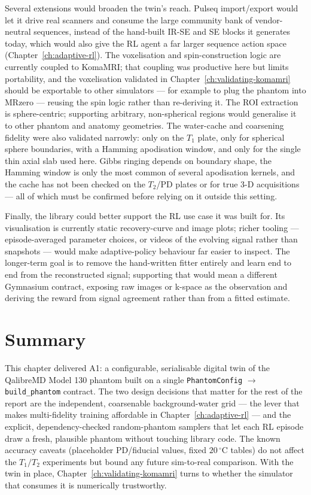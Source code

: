 Several extensions would broaden the twin's reach. Pulseq import/export would
let it drive real scanners and consume the large community bank of
vendor-neutral sequences, instead of the hand-built IR-SE and SE blocks it
generates today, which would also give the RL agent a far larger sequence
action space (Chapter~\ref{ch:adaptive-rl}). The voxelisation and
spin-construction logic are currently coupled to KomaMRI; that coupling was
productive here but limits portability, and the voxelisation validated in
Chapter~\ref{ch:validating-komamri} should be exportable to other simulators ---
for example to plug the phantom into MRzero --- reusing the spin logic rather
than re-deriving it. The ROI extraction is sphere-centric; supporting arbitrary,
non-spherical regions would generalise it to other phantom and anatomy
geometries. The water-cache and coarsening fidelity were also validated
narrowly: only on the $T_1$ plate, only for spherical sphere boundaries, with a
Hamming apodisation window, and only for the single thin axial slab used here.
Gibbs ringing depends on boundary shape, the Hamming window is only the most
common of several apodisation kernels, and the cache has not been checked on the
$T_2$/PD plates or for true 3-D acquisitions --- all of which must be confirmed
before relying on it outside this setting.

Finally, the library could better support the RL use case it was built for. Its
visualisation is currently static recovery-curve and image plots; richer tooling
--- episode-averaged parameter choices, or videos of the evolving signal rather
than snapshots --- would make adaptive-policy behaviour far easier to inspect.
The longer-term goal is to remove the hand-written fitter entirely and learn end
to end from the reconstructed signal; supporting that would mean a different
Gymnasium contract, exposing raw images or k-space as the observation and
deriving the reward from signal agreement rather than from a fitted estimate.

\section{Summary}
\label{sec:twin-summary}

This chapter delivered A1: a configurable, serialisable digital twin of the
QalibreMD Model 130 phantom built on a single \texttt{PhantomConfig} $\to$
\texttt{build\_phantom} contract. The two design decisions that matter for
the rest of the report are the independent, coarsenable background-water grid
--- the lever that makes multi-fidelity training affordable in
Chapter~\ref{ch:adaptive-rl} --- and the explicit, dependency-checked
random-phantom samplers that let each RL episode draw a fresh, plausible
phantom without touching library code. The known accuracy caveats
(placeholder PD/fiducial values, fixed $20\,^{\circ}$C tables) do not affect
the $T_1/T_2$ experiments but bound any future sim-to-real comparison. With
the twin in place, Chapter~\ref{ch:validating-komamri} turns to whether the
simulator that consumes it is numerically trustworthy.
